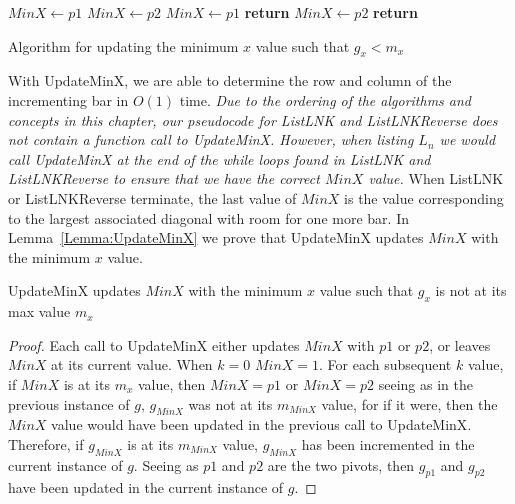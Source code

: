 \begin{theorem}
\begin{theorem}
\begin{algorithm}
  \begin{algorithmic}[1]
        \State $MinX \gets p1$
      \EndIf 
        \State $MinX \gets p2$ 
      \EndIf 
          \State $MinX \gets p1$
          \textbf{return}
        \EndIf
          \State $MinX \gets p2$
          \textbf{return}
        \EndIf
      \EndIf
    \EndFunction
  \end{algorithmic}
  \caption{Algorithm for updating the minimum $x$ value such that $g_{x}<m_{x}$}
  \label{Alg:UpdateMinX}
\end{algorithm}
With {\sc UpdateMinX}, we are able to determine the row and column of the incrementing bar in $O(1)$ time. 
\emph{Due to the ordering of the algorithms and concepts in this chapter, our 
pseudocode for {\sc ListLNK} and {\sc ListLNKReverse} does not contain a function call to {\sc UpdateMinX}. However, when listing $L_{n}$ 
we would call {\sc UpdateMinX} at the end of the while loops found in {\sc ListLNK} and {\sc ListLNKReverse} to ensure 
that we have the correct $MinX$ value.} When {\sc ListLNK} or {\sc ListLNKReverse} terminate, the last value 
of $MinX$ is the value corresponding to the largest associated diagonal with room for one more bar. 
In Lemma~\ref{Lemma:UpdateMinX} we prove that {\sc UpdateMinX} updates $MinX$ with the minimum $x$ value. 
\begin{lemma}
  {\sc UpdateMinX} updates $MinX$ with the minimum $x$ value such that $g_{x}$ is not at its max value $m_{x}$
  \label{Lemma:UpdateMinX}
\end{lemma}
\begin{proof}
 Each call to {\sc UpdateMinX} either updates $MinX$ with $p1$ or $p2$, or leaves $MinX$ at its current value. When $k=0$ 
 $MinX=1$. For each subsequent $k$ value, if $MinX$ is at its $m_{x}$ value, then $MinX=p1$ or $MinX=p2$ seeing as in the previous 
 instance of $g$, $g_{MinX}$ was not at its $m_{MinX}$ value, for if it were, then the $MinX$ value would have been updated in the previous 
 call to {\sc UpdateMinX}. Therefore, if $g_{MinX}$ is at its $m_{MinX}$ value, $g_{MinX}$ has been incremented in the current instance of 
 $g$. Seeing as $p1$ and $p2$ are the two pivots, then $g_{p1}$ and $g_{p2}$ have been updated in the current instance of $g$. 

\end{proof}
\end{theorem}
\end{theorem}
